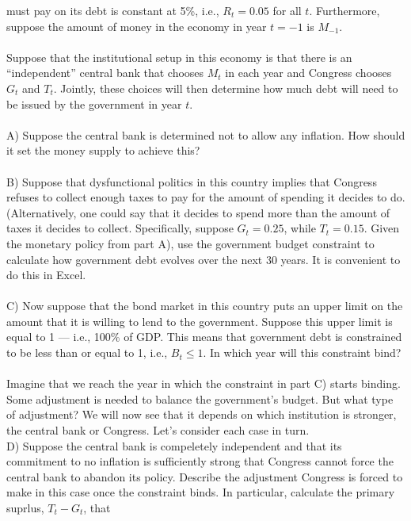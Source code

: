 \begin{homeworkProblem}[1]
    must pay on its debt is constant at 5\%, i.e., $R_t=0.05$ for all $t$. Furthermore,
    suppose the amount of money in the economy in year $t=-1$ is $M_{-1}$. 
    \\ \\
    Suppose that the institutional setup in this economy is that there is an 
    ``independent'' central bank that chooses $M_t$ in each year and Congress 
    chooses $G_t$ and $T_t$. Jointly, these choices will then determine how much 
    debt will need to be issued by the government in year $t$. 
    \\ \\
    A) Suppose the central bank is determined not to allow any inflation. How 
    should it set the money supply to achieve this?
    \\ \\
    B) Suppose that dysfunctional politics in this country implies that Congress 
    refuses to collect enough taxes to pay for the amount of spending it decides to 
    do. (Alternatively, one could say that it decides to spend more than the amount 
    of taxes it decides to collect. Specifically, suppose $G_t = 0.25$, while $T_t
    = 0.15$. Given the monetary policy from part A), use the government budget constraint
    to calculate how government debt evolves over the next 30 years. It is convenient
    to do this in Excel. 
    \\ \\
    C) Now suppose that the bond market in this country puts an upper limit on the amount
    that it is willing to lend to the government. Suppose this upper limit is equal to
    1 --- i.e., 100\% of GDP. This means that government debt is constrained to be less
    than or equal to 1, i.e., $B_t \leq 1$. In which year will this constraint bind?
    \\ \\
    Imagine that we reach the year in which the constraint in part C) starts binding. 
    Some adjustment is needed to balance the government's budget. But what type of 
    adjustment? We will now see that it depends on which institution is stronger, the
    central bank or Congress. Let's consider each case in turn. 
    \\
    D) Suppose the central bank is compeletely independent and that its commitment to no
    inflation is sufficiently strong that Congress cannot force the central bank to abandon
    its policy. Describe the adjustment Congress is forced to make in this case once the
    constraint binds. In particular, calculate the primary suprlus, $T_t - G_t$, that 

\end{homeworkProblem}
